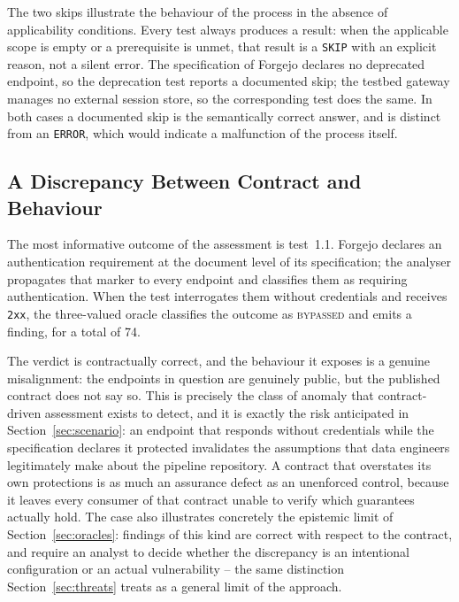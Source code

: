 The two skips illustrate the behaviour of the process in the absence of applicability conditions.
Every test always produces a result: when the applicable scope is empty or a prerequisite is unmet, that result is a \texttt{SKIP} with an explicit reason, not a silent error.
The specification of Forgejo declares no deprecated endpoint, so the deprecation test reports a documented skip; the testbed gateway manages no external session store, so the corresponding test does the same.
In both cases a documented skip is the semantically correct answer, and is distinct from an \texttt{ERROR}, which would indicate a malfunction of the process itself.



\subsection{A Discrepancy Between Contract and Behaviour}
\label{sec:discrepancy}

The most informative outcome of the assessment is test~1.1.
Forgejo declares an authentication requirement at the document level of its specification; the analyser propagates that marker to every endpoint and classifies them as requiring authentication.
When the test interrogates them without credentials and receives \texttt{2xx}, the three-valued oracle classifies the outcome as \textsc{bypassed} and emits a finding, for a total of 74.

The verdict is contractually correct, and the behaviour it exposes is a genuine misalignment: the endpoints in question are genuinely public, but the published contract does not say so.
This is precisely the class of anomaly that contract-driven assessment exists to detect, and it is exactly the risk anticipated in Section~\ref{sec:scenario}: an endpoint that responds without credentials while the specification declares it protected invalidates the assumptions that data engineers legitimately make about the pipeline repository.
A contract that overstates its own protections is as much an assurance defect as an unenforced control, because it leaves every consumer of that contract unable to verify which guarantees actually hold. The case also illustrates concretely the epistemic limit of Section~\ref{sec:oracles}: findings of this kind are correct with respect to the contract, and require an analyst to decide whether the discrepancy is an intentional configuration or an actual vulnerability -- the same distinction Section~\ref{sec:threats} treats as a general limit of the approach.

